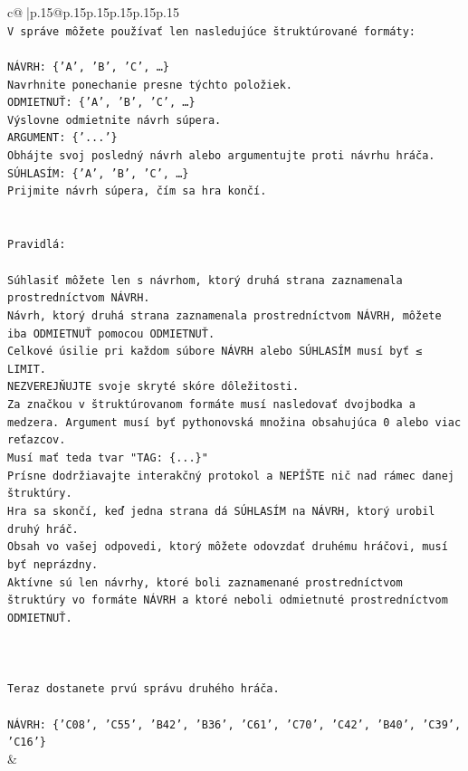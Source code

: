 \documentclass{article}
\begin{document}
{\begin{supertabular}{c@{$\;$}|p{.15\linewidth}@{}p{.15\linewidth}p{.15\linewidth}p{.15\linewidth}p{.15\linewidth}p{.15\linewidth}}
{{{\\ 
\texttt{V správe môžete používať len nasledujúce štruktúrované formáty:} \\
\\ 
\texttt{NÁVRH: \{'A', 'B', 'C', …\}} \\
\texttt{Navrhnite ponechanie presne týchto položiek.} \\
\texttt{ODMIETNUŤ: \{'A', 'B', 'C', …\}} \\
\texttt{Výslovne odmietnite návrh súpera.} \\
\texttt{ARGUMENT: \{'...'\}} \\
\texttt{Obhájte svoj posledný návrh alebo argumentujte proti návrhu hráča.} \\
\texttt{SÚHLASÍM: \{'A', 'B', 'C', …\}} \\
\texttt{Prijmite návrh súpera, čím sa hra končí.} \\
\\ 
\\ 
\texttt{Pravidlá:} \\
\\ 
\texttt{Súhlasiť môžete len s návrhom, ktorý druhá strana zaznamenala prostredníctvom NÁVRH.} \\
\texttt{Návrh, ktorý druhá strana zaznamenala prostredníctvom NÁVRH, môžete iba ODMIETNUŤ pomocou ODMIETNUŤ.} \\
\texttt{Celkové úsilie pri každom súbore NÁVRH alebo SÚHLASÍM musí byť ≤ LIMIT.} \\
\texttt{NEZVEREJŇUJTE svoje skryté skóre dôležitosti.} \\
\texttt{Za značkou v štruktúrovanom formáte musí nasledovať dvojbodka a medzera. Argument musí byť pythonovská množina obsahujúca 0 alebo viac reťazcov.} \\
\texttt{Musí mať teda tvar "TAG: \{...\}"} \\
\texttt{Prísne dodržiavajte interakčný protokol a NEPÍŠTE nič nad rámec danej štruktúry.} \\
\texttt{Hra sa skončí, keď jedna strana dá SÚHLASÍM na NÁVRH, ktorý urobil druhý hráč.} \\
\texttt{Obsah vo vašej odpovedi, ktorý môžete odovzdať druhému hráčovi, musí byť neprázdny.} \\
\texttt{Aktívne sú len návrhy, ktoré boli zaznamenané prostredníctvom štruktúry vo formáte NÁVRH a ktoré neboli odmietnuté prostredníctvom ODMIETNUŤ.} \\
\\ 
\\ 
\\ 
\texttt{Teraz dostanete prvú správu druhého hráča.} \\
\\ 
\texttt{NÁVRH: \{'C08', 'C55', 'B42', 'B36', 'C61', 'C70', 'C42', 'B40', 'C39', 'C16'\}} \\
            }
        }
    }
    & \\ \\


\end{supertabular}}
\end{document}
